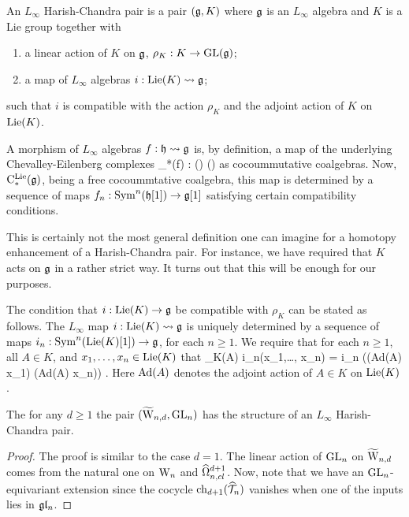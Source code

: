 \documentclass[10pt]{amsart}
\begin{document}
\begin{dfn} An $L_\infty$ Harish-Chandra pair is a pair $(\mathfrak g,K)$ where $\mathfrak g$ is an $L_\infty$ algebra and $K$ is a Lie group together with
\begin{enumerate}
\item a linear action of $K$ on $\mathfrak g$, $\rho_K : K \to {\rm GL}(\mathfrak g)$;
\item a map of $L_\infty$ algebras $i : {\rm Lie}(K) \rightsquigarrow \mathfrak g$;
\end{enumerate}
such that $i$ is compatible with the action $\rho_K$ and the adjoint action of $K$ on ${\rm Lie}(K)$.
\end{dfn}

\begin{rmk}
A morphism of $L_\infty$ algebras $f : \mathfrak h \rightsquigarrow \mathfrak g$ is, by definition, a map of the underlying Chevalley-Eilenberg complexes
\ben
\clieu_*(f) : \clieu(\fh) \to \clieu(\fg)
\een 
as cocoummutative coalgebras. 
Now, ${\rm C}^{\rm Lie}_*(\mathfrak g)$, being a free cocoummtative coalgebra, this map is determined by a sequence of maps $f_n : {\rm Sym}^n(\mathfrak h[1]) \to \mathfrak g[1]$ satisfying certain compatibility conditions. 
\end{rmk}

\begin{rmk} 
This is certainly not the most general definition one can imagine for a homotopy enhancement of a Harish-Chandra pair. 
For instance, we have required that $K$ acts on $\mathfrak g$ in a rather strict way. 
It turns out that this will be enough for our purposes.
\end{rmk}

The condition that $i : {\rm Lie}(K) \to \mathfrak g$ be compatible with $\rho_K$ can be stated as follows. 
The $L_\infty$ map $i : {\rm Lie}(K) \rightsquigarrow \mathfrak g$ is uniquely determined by a sequence of maps $i_n : {\rm Sym}^n({\rm Lie}(K)[1]) \to \mathfrak g$, for each $n \geq 1$. 
We require that for each $n \geq 1$, all $A \in K$, and $x_1,\ldots, x_n \in {\rm Lie}(K)$ that
\ben
\rho_K(A) \cdot i_n(x_1,\ldots, x_n) = i_n \left(\left({\rm Ad}(A) \cdot x_{1}\right) \cdots  \left({\rm Ad}(A) \cdot x_{n}\right)\right) .
\een 
Here ${\rm Ad}(A)$ denotes the adjoint action of $A \in K$ on ${\rm Lie}(K)$. 

\begin{lem} The for any $d \geq 1$ the pair $(\widetilde{\rm W}_{n,d}, {\rm GL}_n)$ has the structure of an $L_\infty$ Harish-Chandra pair.
\end{lem}
\begin{proof}
The proof is similar to the case $d=1$. 
The linear action of ${\rm GL}_n$ on $\widetilde{\rm W}_{n,d}$ comes from the natural one on ${{\rm W}_n}$ and $\widehat{\Omega}^{d+1}_{n,cl}$. 
Now, note that we have an ${\rm GL}_n$-equivariant extension
\ben
{}
\een
since the cocycle ${\rm ch}_{d+1}(\widehat{\mathcal T}_n)$ vanishes when one of the inputs lies in $\mathfrak{g} \mathfrak{l}_n$. 
\end{proof}
\end{document}
